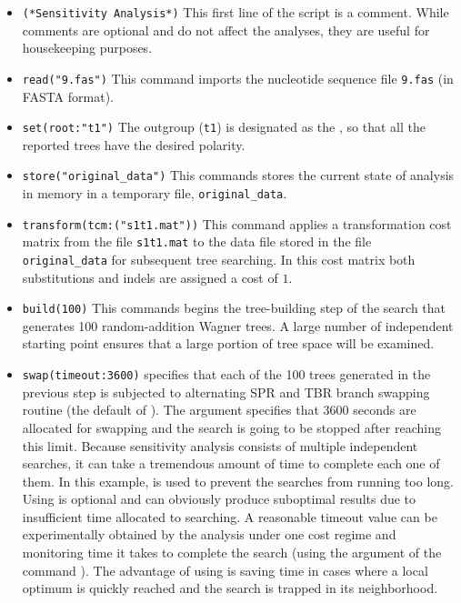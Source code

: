 \begin{itemize}
\item \texttt{(*Sensitivity Analysis*)} This first line of the script is a comment. While comments are optional and do not
 affect the analyses, they are useful for housekeeping purposes.
\item \texttt{read("9.fas")} This command imports the nucleotide sequence file \texttt{9.fas} (in FASTA format).
\item \texttt{set(root:"t1")} The outgroup (\texttt{t1}) is designated as the , so that all the 
reported trees have the desired polarity.
\item \texttt{store("original\_data")} This commands stores the current state of analysis in memory in a temporary file, 
\texttt{original\_data}.
\item \texttt{transform(tcm:("s1t1.mat"))} This command applies a transformation cost matrix from the file \texttt{s1t1.mat} to 
the data file stored in the file \texttt{original\_data} for subsequent tree searching. In this cost matrix both substitutions 
and indels are assigned a cost of $ 1 $.
\item \texttt{build(100)} This commands begins the tree-building step of the search that generates 100 random-addition 
Wagner trees. A large number of independent starting point ensures that a large portion of tree space will be 
examined.
\item \texttt{swap(timeout:3600)}  specifies that each of the 100 trees generated in the previous step is 
subjected to alternating SPR and TBR branch swapping routine (the default of \poy). The argument 
 specifies that 3600 seconds are allocated for swapping and the search is going to be stopped 
after reaching this limit. Because sensitivity analysis consists of multiple independent searches, it can take a 
tremendous amount of time to complete each one of them. In this example,  is used to prevent 
the searches from running too long. Using  is optional and can obviously produce suboptimal 
results due to insufficient time allocated to searching. A reasonable timeout value can be experimentally obtained by 
the analysis under one cost regime and monitoring time it takes to complete the search (using the argument 
 of the command ). The advantage of using  is saving 
time in cases where a local optimum is quickly reached and the search is trapped in its neighborhood.

\end{itemize}
